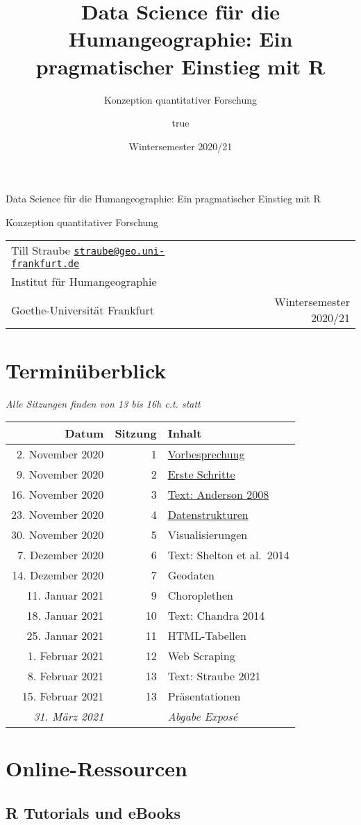 \documentclass[11pt,german,a4paper]{article}
\title{Data Science für die Humangeographie: Ein pragmatischer Einstieg mit R}
\subtitle{Konzeption quantitativer Forschung}
\author{true}
\date{Wintersemester 2020/21}
\makeatletter
\renewcommand{\maketitle}{
  \newpage
  \begingroup
    \setlength{\parindent}{0pt}
    \setlength{\parskip}{4pt}
    {\fontseries{b}\selectfont\Huge{Data Science für die Humangeographie: Ein pragmatischer Einstieg mit R}\par}
    {\fontseries{l}\LARGE{Konzeption quantitativer Forschung}\par\bigskip}

    \bigskip

    \begin{tabularx}{\textwidth}{@{}X r}
                  Till Straube
        \newline \href{mailto:straube@geo.uni-frankfurt.de}{\nolinkurl{straube@geo.uni-frankfurt.de}}
                  \medskip\newline
          {\renewcommand\\{\newline}Institut für Humangeographie\\
Goethe-Universität Frankfurt}
         &
                    Wintersemester 2020/21
        \end{tabularx}
  \endgroup
  \vspace{1.1cm}
  \thispagestyle{plain}%
}
\makeatother
\begin{document}
\maketitle

{
\setcounter{tocdepth}{2}
\tableofcontents
}
\hypertarget{terminuxfcberblick}{%
\section*{Terminüberblick}\label{terminuxfcberblick}}

\emph{Alle Sitzungen finden von 13 bis 16h c.t. statt}

\begin{longtable}[]{@{}rrl@{}}
\toprule
Datum & Sitzung & Inhalt\tabularnewline
\midrule
\endhead
2. November 2020 & 1 & \protect\hyperlink{vorbesprechung}{Vorbesprechung}\tabularnewline
9. November 2020 & 2 & \protect\hyperlink{erste-schritte}{Erste Schritte}\tabularnewline
16. November 2020 & 3 & \protect\hyperlink{text-anderson-2008}{Text: Anderson 2008}\tabularnewline
23. November 2020 & 4 & \protect\hyperlink{datenstrukturen}{Datenstrukturen}\tabularnewline
30. November 2020 & 5 & Visualisierungen\tabularnewline
7. Dezember 2020 & 6 & Text: Shelton et al.~2014\tabularnewline
14. Dezember 2020 & 7 & Geodaten\tabularnewline
11. Januar 2021 & 9 & Choroplethen\tabularnewline
18. Januar 2021 & 10 & Text: Chandra 2014\tabularnewline
25. Januar 2021 & 11 & HTML-Tabellen\tabularnewline
1. Februar 2021 & 12 & Web Scraping\tabularnewline
8. Februar 2021 & 13 & Text: Straube 2021\tabularnewline
15. Februar 2021 & 13 & Präsentationen\tabularnewline
\emph{31. März 2021} & & \emph{Abgabe Exposé}\tabularnewline
\bottomrule
\end{longtable}

\hypertarget{online-ressourcen}{%
\section*{Online-Ressourcen}\label{online-ressourcen}}

\hypertarget{r-tutorials-und-ebooks}{%
\subsection*{R Tutorials und eBooks}\label{r-tutorials-und-ebooks}}
\end{document}
